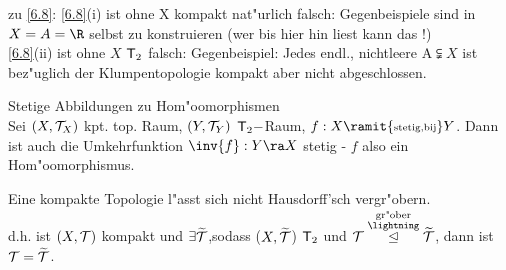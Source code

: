 \begin{bem}\label{6.10}zu \ref{6.8}:
\ref{6.8}(i) ist ohne X kompakt nat"urlich falsch: Gegenbeispiele sind in $X=A=\R$ selbst zu konstruieren (wer bis hier hin liest kann das !)\\
\ref{6.8}(ii) ist ohne $X$ $\mbox{\sf T}_2$ falsch: Gegenbeispiel: Jedes endl., nichtleere A$\subsetneqq X$ ist bez"uglich der Klumpentopologie kompakt aber {\sc nicht} abgeschlossen.
\end{bem}

\begin{satz}\label{6.11}{\sc Stetige Abbildungen zu Hom"oomorphismen}\\
Sei $(X,\mathcal T_X)$ kpt. top. Raum, $(Y,\mathcal T_Y)$  $\mbox{\sf T}_2-$Raum, $f:X\ramit{\mbox{\scriptsize stetig,bij}}Y$. Dann ist auch die Umkehrfunktion $\inv{f}:Y\ra X$ stetig - $f$ also ein Hom"oomorphismus.
\end{satz}
\begin{kor}\label{6.12}Eine kompakte Topologie l"asst sich nicht {\sc Hausdorff}'sch vergr"obern.\vspace*{-0.4cm}\\
d.h. ist $(X,\mathcal T)$ kompakt und $\exists \widetilde{\mathcal T}$,sodass ($X,\widetilde{\mathcal T}$) $\mbox{\sf T}_2$ und $\T\stackrel{\stackrel{\mbox{\scriptsize gr"ober}}{\lightning}}{\unlhd}\widetilde{\T}$, dann ist $\mathcal T =\widetilde{\mathcal T}$.
\end{kor}

